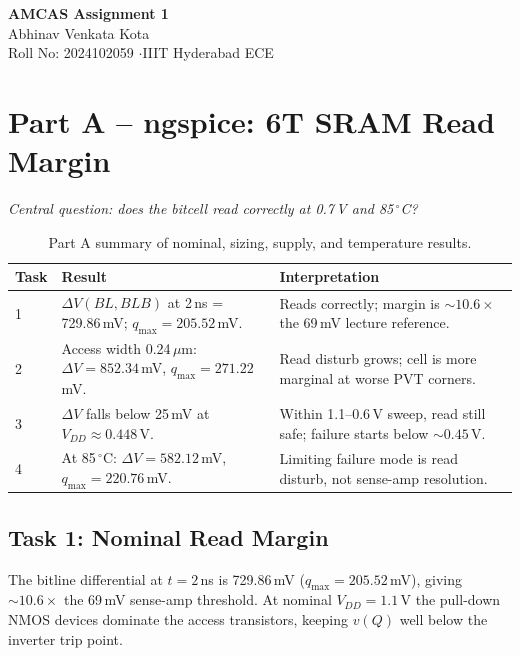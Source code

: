 \documentclass[a4paper,11pt]{article}
\begin{document}
\begin{center}
    {\Large\bfseries AMCAS Assignment 1}\\[0.5em]
    {\large Abhinav Venkata Kota}\\[0.1em]
    {\normalsize Roll No: 2024102059 \quad$\cdot$\quad IIIT Hyderabad ECE}
\end{center}

\vspace{0.3em}

\section*{Part A -- ngspice: 6T SRAM Read Margin}

\textit{Central question: does the bitcell read correctly at 0.7\,V and 85\,$^\circ$C?}

\begin{table}[H]
\centering
\small
\begin{tabularx}{\textwidth}{l X X}
\toprule
\textbf{Task} & \textbf{Result} & \textbf{Interpretation} \\
\midrule
1 & $\Delta V(BL,BLB)$ at 2\,ns = 729.86\,mV; $q_{\max}=205.52$\,mV. & Reads correctly; margin is ${\sim}10.6\times$ the 69\,mV lecture reference. \\[0.2em]
2 & Access width 0.24\,$\mu$m: $\Delta V=852.34$\,mV, $q_{\max}=271.22$\,mV. & Read disturb grows; cell is more marginal at worse PVT corners. \\[0.2em]
3 & $\Delta V$ falls below 25\,mV at $V_{DD}\approx0.448$\,V. & Within 1.1--0.6\,V sweep, read still safe; failure starts below ${\sim}0.45$\,V. \\[0.2em]
4 & At 85\,$^\circ$C: $\Delta V=582.12$\,mV, $q_{\max}=220.76$\,mV. & Limiting failure mode is read disturb, not sense-amp resolution. \\
\bottomrule
\end{tabularx}
\caption{Part A summary of nominal, sizing, supply, and temperature results.}
\end{table}

\subsection*{Task 1: Nominal Read Margin}

The bitline differential at $t=2$\,ns is 729.86\,mV ($q_{\max}=205.52$\,mV), giving ${\sim}10.6\times$ the 69\,mV sense-amp threshold. At nominal $V_{DD}=1.1$\,V the pull-down NMOS devices dominate the access transistors, keeping $v(Q)$ well below the inverter trip point.
\end{document}
